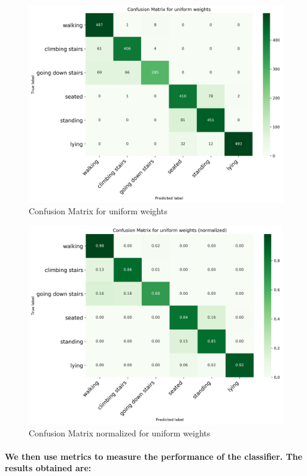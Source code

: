 \documentclass[a4paper]{article}    %
\begin{document}
\begin{figure}[H]
    \centering
    \includegraphics[width=12cm]{cm_uniform}
    \caption{Confusion Matrix for uniform weights}
    \label{fig:ex2-b-cm_uniform}
\end{figure}

\begin{figure}[H]
    \centering
    \includegraphics[width=12cm]{cm_uniform_normalized}
    \caption{Confusion Matrix normalized for uniform weights}
    \label{fig:ex2-b-cm_uniform_normalized}
\end{figure}

\paragraph{We then use metrics to measure the performance of the classifier. The results obtained are:}
\end{document}
